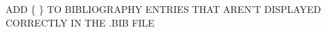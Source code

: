 \documentclass[12pt]{article}
\begin{document}
	
	

	\newpage
	
	
	
	\newpage
	
	
	
	\newpage
	
	\tableofcontents
	
	\newpage
	
	
	
	\newpage
	
	
	
	\newpage
	
	
	
	\newpage

	

	\newpage
	
	

	\newpage

	ADD \{ \} TO BIBLIOGRAPHY ENTRIES THAT AREN'T DISPLAYED CORRECTLY IN THE .BIB FILE
	
	
	
\end{document}
